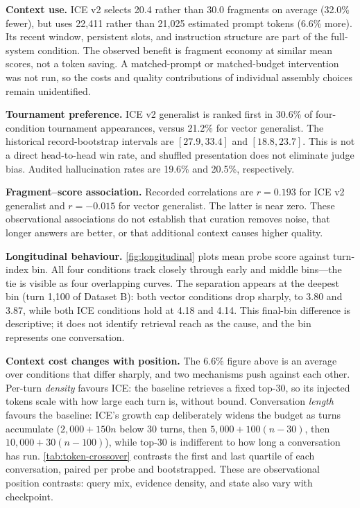 \documentclass[11pt,a4paper]{article}
\begin{document}
\textbf{Context use.} ICE v2 selects 20.4 rather than 30.0 fragments on average (32.0\% fewer), but uses 22,411 rather than 21,025 estimated prompt tokens (6.6\% more). Its recent window, persistent slots, and instruction structure are part of the full-system condition. The observed benefit is fragment economy at similar mean scores, not a token saving. A matched-prompt or matched-budget intervention was not run, so the costs and quality contributions of individual assembly choices remain unidentified.

\textbf{Tournament preference.} ICE v2 generalist is ranked first in 30.6\% of four-condition tournament appearances, versus 21.2\% for vector generalist. The historical record-bootstrap intervals are $[27.9,33.4]$ and $[18.8,23.7]$. This is not a direct head-to-head win rate, and shuffled presentation does not eliminate judge bias. Audited hallucination rates are 19.6\% and 20.5\%, respectively.

\textbf{Fragment--score association.} Recorded correlations are $r=0.193$ for ICE v2 generalist and $r=-0.015$ for vector generalist. The latter is near zero. These observational associations do not establish that curation removes noise, that longer answers are better, or that additional context causes higher quality.

\textbf{Longitudinal behaviour.} \cref{fig:longitudinal} plots mean probe score against turn-index bin. All four conditions track closely through early and middle bins---the tie is visible as four overlapping curves. The separation appears at the deepest bin (turn 1{,}100 of Dataset B): both vector conditions drop sharply, to 3.80 and 3.87, while both ICE conditions hold at 4.18 and 4.14. This final-bin difference is descriptive; it does not identify retrieval reach as the cause, and the bin represents one conversation.

\textbf{Context cost changes with position.} The 6.6\% figure above is an average over conditions that differ sharply, and two mechanisms push against each other. Per-turn \emph{density} favours ICE: the baseline retrieves a fixed top-30, so its injected tokens scale with how large each turn is, without bound. Conversation \emph{length} favours the baseline: ICE's growth cap deliberately widens the budget as turns accumulate ($2{,}000 + 150n$ below 30 turns, then $5{,}000 + 100(n-30)$, then $10{,}000 + 30(n-100)$), while top-30 is indifferent to how long a conversation has run. \cref{tab:token-crossover} contrasts the first and last quartile of each conversation, paired per probe and bootstrapped. These are observational position contrasts: query mix, evidence density, and state also vary with checkpoint.
\end{document}
